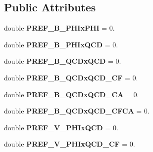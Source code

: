 \subsection*{Public Attributes}
\begin{DoxyCompactItemize}
\item 
\hypertarget{structAmplitudePrefactors_a940b1fc2d7789c9b6827c08890b58505}{}double {\bfseries P\+R\+E\+F\+\_\+\+B\+\_\+\+P\+H\+Ix\+P\+H\+I} = 0.\label{structAmplitudePrefactors_a940b1fc2d7789c9b6827c08890b58505}

\item 
\hypertarget{structAmplitudePrefactors_a2364b05d8c6008647d2d7b17ed9a64ef}{}double {\bfseries P\+R\+E\+F\+\_\+\+B\+\_\+\+P\+H\+Ix\+Q\+C\+D} = 0.\label{structAmplitudePrefactors_a2364b05d8c6008647d2d7b17ed9a64ef}

\item 
\hypertarget{structAmplitudePrefactors_a035afe555195dc9e1712eace6f92b0b0}{}double {\bfseries P\+R\+E\+F\+\_\+\+B\+\_\+\+Q\+C\+Dx\+Q\+C\+D} = 0.\label{structAmplitudePrefactors_a035afe555195dc9e1712eace6f92b0b0}

\item 
\hypertarget{structAmplitudePrefactors_af32002d54ac168e1ac1be1bed997ef6b}{}double {\bfseries P\+R\+E\+F\+\_\+\+B\+\_\+\+Q\+C\+Dx\+Q\+C\+D\+\_\+\+C\+F} = 0.\label{structAmplitudePrefactors_af32002d54ac168e1ac1be1bed997ef6b}

\item 
\hypertarget{structAmplitudePrefactors_a1bf88c2fd332ab76c3af857875fe8d07}{}double {\bfseries P\+R\+E\+F\+\_\+\+B\+\_\+\+Q\+C\+Dx\+Q\+C\+D\+\_\+\+C\+A} = 0.\label{structAmplitudePrefactors_a1bf88c2fd332ab76c3af857875fe8d07}

\item 
\hypertarget{structAmplitudePrefactors_a1b9290fdb263ecf6063c0dc75e7623be}{}double {\bfseries P\+R\+E\+F\+\_\+\+B\+\_\+\+Q\+C\+Dx\+Q\+C\+D\+\_\+\+C\+F\+C\+A} = 0.\label{structAmplitudePrefactors_a1b9290fdb263ecf6063c0dc75e7623be}

\item 
\hypertarget{structAmplitudePrefactors_a92eace16b4b1c4e3025896c80431be15}{}double {\bfseries P\+R\+E\+F\+\_\+\+V\+\_\+\+P\+H\+Ix\+Q\+C\+D} = 0.\label{structAmplitudePrefactors_a92eace16b4b1c4e3025896c80431be15}

\item 
\hypertarget{structAmplitudePrefactors_a0ce4f73dabd952d1c9ec7626413a0c54}{}double {\bfseries P\+R\+E\+F\+\_\+\+V\+\_\+\+P\+H\+Ix\+Q\+C\+D\+\_\+\+C\+F} = 0.\label{structAmplitudePrefactors_a0ce4f73dabd952d1c9ec7626413a0c54}


\end{DoxyCompactItemize}
